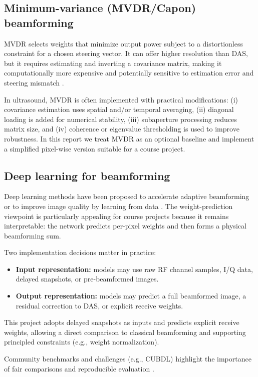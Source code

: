 \documentclass[conference]{IEEEtran}
\begin{document}
\subsection{Minimum-variance (MVDR/Capon) beamforming}
MVDR selects weights that minimize output power subject to a distortionless constraint for a chosen steering vector. It can offer higher resolution than DAS, but it requires estimating and inverting a covariance matrix, making it computationally more expensive and potentially sensitive to estimation error and steering mismatch \cite{capon1969high,vanveen1988beamforming}.

In ultrasound, MVDR is often implemented with practical modifications: (i) covariance estimation uses spatial and/or temporal averaging, (ii) diagonal loading is added for numerical stability, (iii) subaperture processing reduces matrix size, and (iv) coherence or eigenvalue thresholding is used to improve robustness. In this report we treat MVDR as an optional baseline and implement a simplified pixel-wise version suitable for a course project.

\subsection{Deep learning for beamforming}
Deep learning methods have been proposed to accelerate adaptive beamforming or to improve image quality by learning from data \cite{luchies2018dnn,luijten2019icassp,vanSloun2020dlus}. The weight-prediction viewpoint is particularly appealing for course projects because it remains interpretable: the network predicts per-pixel weights and then forms a physical beamforming sum.

Two implementation decisions matter in practice:
\begin{itemize}
    \item \textbf{Input representation:} models may use raw RF channel samples, I/Q data, delayed snapshots, or pre-beamformed images.
    \item \textbf{Output representation:} models may predict a full beamformed image, a residual correction to DAS, or explicit receive weights.
\end{itemize}
This project adopts delayed snapshots as inputs and predicts explicit receive weights, allowing a direct comparison to classical beamforming and supporting principled constraints (e.g., weight normalization).

Community benchmarks and challenges (e.g., CUBDL) highlight the importance of fair comparisons and reproducible evaluation \cite{cubdl2020}.
\end{document}
